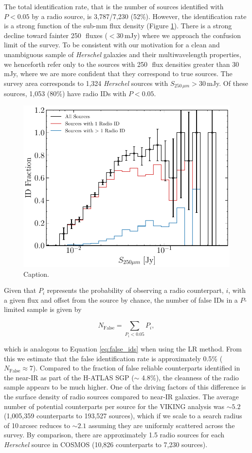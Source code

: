 The total identification rate, that is the number of sources identified with $P < 0.05$ by a radio source, is 3,787/7,230 (52\%). However, the identification rate is a strong function of the sub-mm flux density (Figure \ref{fig:id_rate}). There is a strong decline toward fainter 250\,\micron\ fluxes ($< 30\,$mJy) where we approach the confusion limit of the survey. To be consistent with our motivation for a clean and unambiguous sample of \textit{Herschel} galaxies and their multiwavelength properties, we henceforth refer only to the sources with 250\,\micron\ flux densities greater than 30\,mJy, where we are more confident that they correspond to true sources. The survey area corresponds to 1,324 \textit{Herschel} sources with $S_{250\,\mu m} > 30\,$mJy. Of these sources, 1,053 (80\%) have radio IDs with $P < 0.05$.

\begin{figure}
	\centering
	\includegraphics[width=0.75\columnwidth]{Figures/id_fraction_radio.pdf}
	\caption{{\color{red} Caption.}}
	\label{fig:id_rate}
\end{figure}

Given that $P_i$ represents the probability of observing a radio counterpart, $i$, with a given flux and offset from the source by chance, the number of false IDs in a $P$-limited sample is given by

\begin{equation}
    N_{\textrm{False}} = \sum_{P_i < 0.05} P_i,
    \label{eq:false_radio_ids}
\end{equation}

\noindent which is analogous to Equation \ref{eq:false_ids} when using the LR method. From this we estimate that the false identification rate is approximately 0.5\% ($N_\textrm{False} \approx 7$). Compared to the fraction of false reliable counterparts identified in the near-IR as part of the H-ATLAS SGP ($\sim$ 4.8\%), the cleanness of the radio sample appears to be much higher. One of the driving factors of this difference is the surface density of radio sources compared to near-IR galaxies. The average number of potential counterparts per source for the VIKING analysis was $\sim 5.2$ (1,005,359 counterparts to 193,527 sources), which if we scale to a search radius of 10\,arcsec reduces to $\sim 2.1$ assuming they are uniformly scattered across the survey. By comparison, there are approximately 1.5 radio sources for each \textit{Herschel} source in COSMOS (10,826 counterparts to 7,230 sources).

